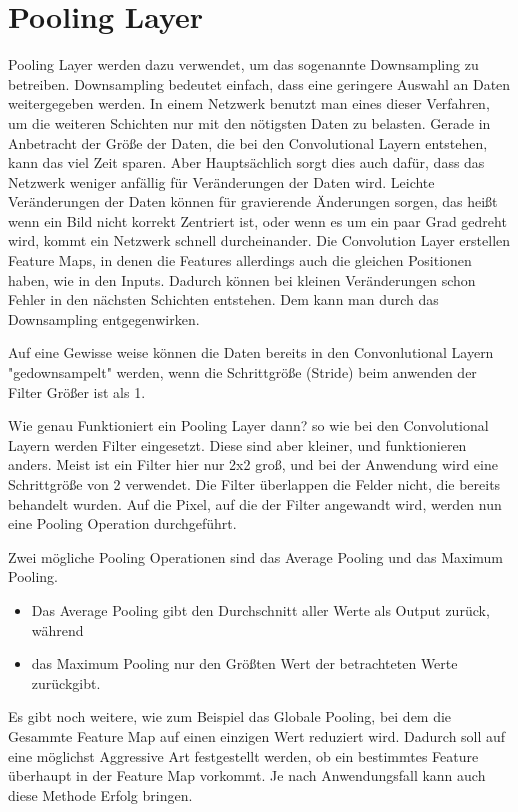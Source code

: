 \documentclass[12pt]{article}
\begin{document}
\clearpage
\section{Pooling Layer}
Pooling Layer werden dazu verwendet, um das sogenannte Downsampling zu betreiben. Downsampling bedeutet einfach, dass eine geringere Auswahl an Daten weitergegeben werden.
In einem Netzwerk benutzt man eines dieser Verfahren, um die weiteren Schichten nur mit den nötigsten Daten zu belasten. Gerade in Anbetracht der Größe der Daten, die bei den Convolutional Layern entstehen, kann das viel Zeit sparen. Aber Hauptsächlich sorgt dies auch dafür, dass das Netzwerk weniger anfällig für Veränderungen der Daten wird. Leichte Veränderungen der Daten können für gravierende Änderungen sorgen, das heißt wenn ein Bild nicht korrekt Zentriert ist, oder wenn es um ein paar Grad gedreht wird, kommt ein Netzwerk schnell durcheinander.
Die Convolution Layer erstellen Feature Maps, in denen die Features allerdings auch die gleichen Positionen haben, wie in den Inputs. Dadurch können bei kleinen Veränderungen schon Fehler in den nächsten Schichten entstehen. Dem kann man durch das Downsampling entgegenwirken.

Auf eine Gewisse weise können die Daten bereits in den Convonlutional Layern "gedownsampelt" werden, wenn die Schrittgröße (Stride) beim anwenden der Filter Größer ist als 1.

Wie genau Funktioniert ein Pooling Layer dann? so wie bei den Convolutional Layern werden Filter eingesetzt. Diese sind aber kleiner, und funktionieren anders. Meist ist ein Filter hier nur 2x2 groß, und bei der Anwendung wird eine Schrittgröße von 2 verwendet. Die Filter überlappen die Felder nicht, die bereits behandelt wurden. 
Auf die Pixel, auf die der Filter angewandt wird, werden nun eine Pooling Operation durchgeführt. 

Zwei mögliche Pooling Operationen sind das Average Pooling und das Maximum Pooling. 
\begin{itemize}
  \item Das Average Pooling gibt den Durchschnitt aller Werte als Output zurück, während
  \item das Maximum Pooling nur den Größten Wert der betrachteten Werte zurückgibt.
\end{itemize}
Es gibt noch weitere, wie zum Beispiel das Globale Pooling, bei dem die Gesammte Feature Map auf einen einzigen Wert reduziert wird. Dadurch soll auf eine möglichst Aggressive Art festgestellt werden, ob ein bestimmtes Feature überhaupt in der Feature Map vorkommt. Je nach Anwendungsfall kann auch diese Methode Erfolg bringen.
\end{document}
